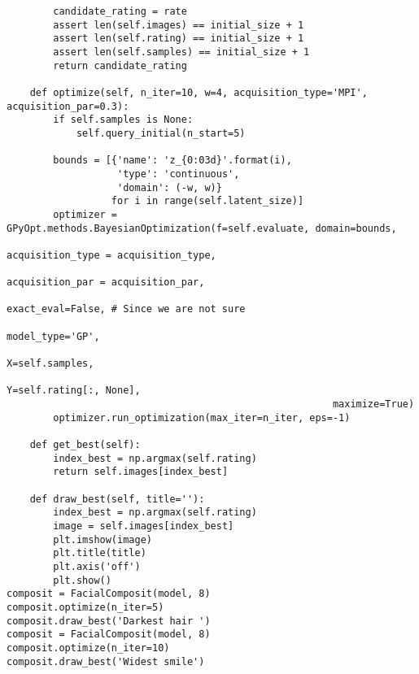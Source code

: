 \begin{footnotesize}
\begin{lstlisting}
        candidate_rating = rate 
        assert len(self.images) == initial_size + 1
        assert len(self.rating) == initial_size + 1
        assert len(self.samples) == initial_size + 1
        return candidate_rating 

    def optimize(self, n_iter=10, w=4, acquisition_type='MPI', acquisition_par=0.3):
        if self.samples is None:
            self.query_initial(n_start=5)

        bounds = [{'name': 'z_{0:03d}'.format(i),
                   'type': 'continuous',
                   'domain': (-w, w)} 
                  for i in range(self.latent_size)]
        optimizer = GPyOpt.methods.BayesianOptimization(f=self.evaluate, domain=bounds,
                                                        acquisition_type = acquisition_type,
                                                        acquisition_par = acquisition_par,
                                                        exact_eval=False, # Since we are not sure
                                                        model_type='GP',
                                                        X=self.samples,
                                                        Y=self.rating[:, None],
                                                        maximize=True)
        optimizer.run_optimization(max_iter=n_iter, eps=-1)

    def get_best(self):
        index_best = np.argmax(self.rating)
        return self.images[index_best]

    def draw_best(self, title=''):
        index_best = np.argmax(self.rating)
        image = self.images[index_best]
        plt.imshow(image)
        plt.title(title)
        plt.axis('off')
        plt.show()
composit = FacialComposit(model, 8)
composit.optimize(n_iter=5)
composit.draw_best('Darkest hair ')
composit = FacialComposit(model, 8)
composit.optimize(n_iter=10)
composit.draw_best('Widest smile')

\end{lstlisting}
\end{footnotesize}